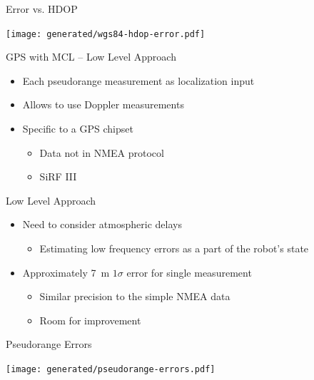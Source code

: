 \documentclass[utf8,12pt]{beamer}
\begin{document}
\begin{frame}[plain]{Error vs. HDOP}
\begin{center}
\centerline{\texttt{[image: generated/wgs84-hdop-error.pdf]}}
\end{center}
\end{frame}

\begin{frame}{GPS with MCL -- Low Level Approach}
    \begin{itemize}
        \item Each pseudorange measurement as localization input
        \item Allows to use Doppler measurements
        \item Specific to a GPS chipset
        \begin{itemize}
            \item Data not in NMEA protocol
            \item SiRF III
        \end{itemize}
    \end{itemize}
\end{frame}

\begin{frame}{Low Level Approach}
    \begin{itemize}
        \item Need to consider atmospheric delays
        \begin{itemize}
            \item Estimating low frequency errors as a part of the robot's state
        \end{itemize}
        \item Approximately \SI{7}{\meter} \(1\sigma\) error for single measurement
        \begin{itemize}
            \item Similar precision to the simple NMEA data
            \item Room for improvement
        \end{itemize}
    \end{itemize}
\end{frame}

\begin{frame}[plain]{Pseudorange Errors}
\begin{center}
\centerline{\texttt{[image: generated/pseudorange-errors.pdf]}}
\end{center}
\end{frame}
\end{document}
